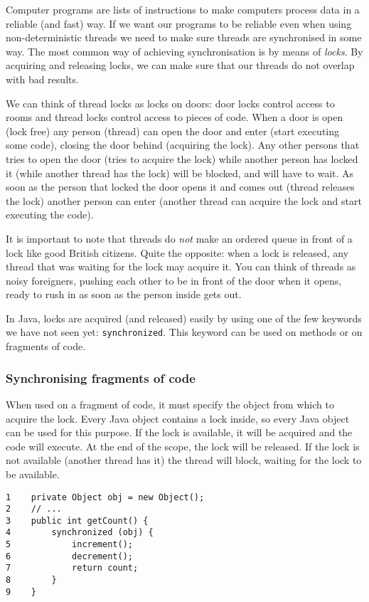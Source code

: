 Computer programs are lists of instructions to make computers process data in a
reliable (and fast) way. If we want our programs to be reliable even
when using non-deterministic threads we need to make sure threads are
synchronised in some way. The most common way of achieving
synchronisation is by means of \emph{locks}. By acquiring and
releasing locks, we can make sure that our threads do not overlap
with bad results. 

We can think of thread locks as locks on doors: door locks control
access to rooms and thread locks control access to pieces of code. 
When a door is open
(lock free) any person (thread) can open the door and enter (start
executing some code),  
closing the door behind (acquiring the lock). 
Any other persons that tries
to open the door (tries to acquire the lock) 
while another person has locked it
(while another thread has the lock) will be blocked, and will have to wait. As
soon as the person that locked the door opens it and comes out (thread
releases the lock) another person can enter (another thread can
acquire the lock and start executing the code). 

It is important to note that threads do \emph{not} make an
ordered queue in front of a lock like good British citizens. Quite the
opposite: when a lock is released, any thread that was waiting for the
lock may acquire it. You can think of threads as noisy foreigners,
pushing each other to be in front of the door when it opens, ready to
rush in as soon as the person inside gets out. 

In Java, locks are acquired (and released) easily by using one of the
few keywords we have not seen yet: \verb+synchronized+. This keyword
can be used on methods or on fragments of code. 

\subsubsection{Synchronising fragments of code}
\label{sec:synchr-fragm-code}

When used on a fragment of code, it must specify the object from which
to acquire the lock. 
%
Every Java object contains a lock inside, so every Java object can be
used for this purpose. 
%
If the lock is available, it will be acquired and the code
will execute. At the end of the scope, the lock will be released. If
the lock is not available (another thread has it) the thread will
block, waiting for the lock to be available. 

\begin{verbatim}
1    private Object obj = new Object();
2    // ...
3    public int getCount() {
4        synchronized (obj) { 
5            increment();
6            decrement();
7            return count;
8        }
9    }
\end{verbatim}

